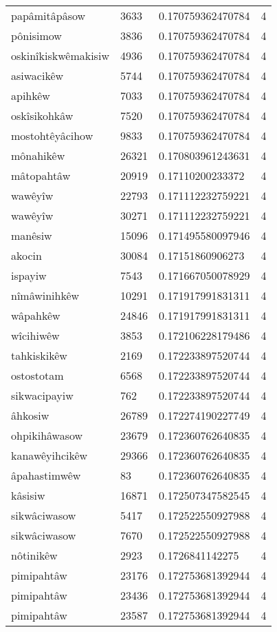 \begin{longtable}{llll}
papâmitâpâsow & 3633 & 0.170759362470784 & 4 \\
pônisimow & 3836 & 0.170759362470784 & 4 \\
oskinîkiskwêmakisiw & 4936 & 0.170759362470784 & 4 \\
asiwacikêw & 5744 & 0.170759362470784 & 4 \\
apihkêw & 7033 & 0.170759362470784 & 4 \\
oskîsikohkâw & 7520 & 0.170759362470784 & 4 \\
mostohtêyâcihow & 9833 & 0.170759362470784 & 4 \\
mônahikêw & 26321 & 0.170803961243631 & 4 \\
mâtopahtâw & 20919 & 0.17110200233372 & 4 \\
wawêyîw & 22793 & 0.171112232759221 & 4 \\
wawêyîw & 30271 & 0.171112232759221 & 4 \\
manêsiw & 15096 & 0.171495580097946 & 4 \\
akocin & 30084 & 0.17151860906273 & 4 \\
ispayiw & 7543 & 0.171667050078929 & 4 \\
nîmâwinihkêw & 10291 & 0.171917991831311 & 4 \\
wâpahkêw & 24846 & 0.171917991831311 & 4 \\
wîcihiwêw & 3853 & 0.172106228179486 & 4 \\
tahkiskikêw & 2169 & 0.172233897520744 & 4 \\
ostostotam & 6568 & 0.172233897520744 & 4 \\
sikwacipayiw & 762 & 0.172233897520744 & 4 \\
âhkosiw & 26789 & 0.172274190227749 & 4 \\
ohpikihâwasow & 23679 & 0.172360762640835 & 4 \\
kanawêyihcikêw & 29366 & 0.172360762640835 & 4 \\
âpahastimwêw & 83 & 0.172360762640835 & 4 \\
kâsisiw & 16871 & 0.172507347582545 & 4 \\
sikwâciwasow & 5417 & 0.172522550927988 & 4 \\
sikwâciwasow & 7670 & 0.172522550927988 & 4 \\
nôtinikêw & 2923 & 0.1726841142275 & 4 \\
pimipahtâw & 23176 & 0.172753681392944 & 4 \\
pimipahtâw & 23436 & 0.172753681392944 & 4 \\
pimipahtâw & 23587 & 0.172753681392944 & 4 \\

\end{longtable}
